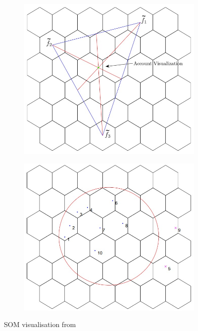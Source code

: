 \begin{figure}
    \begin{subfigure}[t]{0.5\textwidth}
        \includegraphics[width=1\textwidth]{images/SOM_user_acc_visualisation.jpg}
        \label{fig:SOM_user_acc_visualisation}
    \end{subfigure}
    \begin{subfigure}[t]{0.5\textwidth}
        \includegraphics[width=1\textwidth]{images/SOM_threshold_bin_classification.jpg}
        \label{fig:SOM_threshold_bin_classification}
    \end{subfigure}
    \caption{\ac{SOM} visualisation from \cite{fd_SOM}}
\end{figure}

